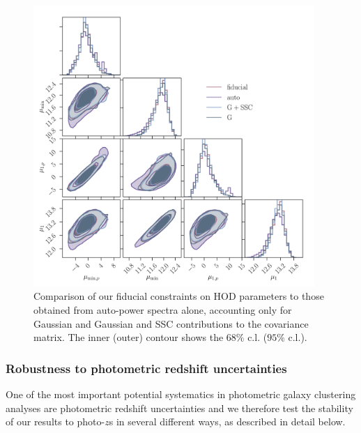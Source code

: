 \documentclass[a4paper,11pt]{article}
\begin{document}
      \begin{figure}
        \begin{center}
          \includegraphics[width=0.95\textwidth]{figures/contours-Mmin-M1_mPk=HOD_fix=alpha-fc-sigmaM_HOD=zevol_fit=pz-shifts-pz-widths+prior=0p2_fit=auto+cross_cosmo=const_HOD-param=zfid_clfit=HOD-zevol_cov=G+NG+SSC-vs-fit=auto-vs-cov=G-vs-cov=G+SSC.pdf}
          \caption{Comparison of our fiducial constraints on HOD parameters to those obtained from auto-power spectra alone, accounting only for Gaussian and Gaussian and SSC contributions to the covariance matrix. The inner (outer) contour shows the $68 \%$ c.l. ($95 \%$ c.l.).} \label{fig:constraints-cov=G+NG+SSC-vs-cov=G-vs-cov=G+SSC-vs-fit=auto}
        \end{center}
      \end{figure}

    \subsubsection{Robustness to photometric redshift uncertainties}
      One of the most important potential systematics in photometric galaxy clustering analyses are photometric redshift uncertainties and we therefore test the stability of our results to photo-$z$s in several different ways, as described in detail below. 
     
\end{document}
